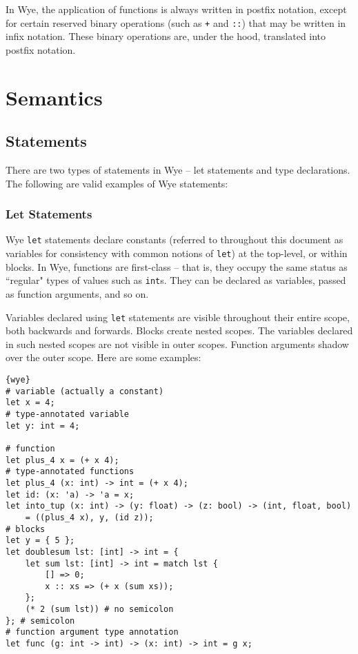 \documentclass[a4paper, 12pt]{article}
\begin{document}
In Wye, the application of functions is always written in postfix notation, except for certain reserved binary operations (such as \texttt{+} and \texttt{::}) that may be written in infix notation. These binary operations are, under the hood, translated into postfix notation.

\section{Semantics}

\subsection{Statements}
There are two types of statements in Wye -- let statements and type declarations. The following are valid examples of Wye statements:

\subsubsection{Let Statements}
Wye \texttt{let} statements declare constants (referred to throughout this document as variables for consistency with common notions of \texttt{let}) at the top-level, or within blocks. In Wye, functions are first-class -- that is, they occupy the same status as ``regular" types of values such as \texttt{int}s. They can be declared as variables, passed as function arguments, and so on.

Variables declared using \texttt{let} statements are visible throughout their entire scope, both backwards and forwards. Blocks create nested scopes. The variables declared in such nested scopes are not visible in outer scopes. Function arguments shadow over the outer scope. Here are some examples:
\begin{lstlisting}{wye}
# variable (actually a constant)
let x = 4;
# type-annotated variable
let y: int = 4;

# function
let plus_4 x = (+ x 4);
# type-annotated functions
let plus_4 (x: int) -> int = (+ x 4);
let id: (x: 'a) -> 'a = x;
let into_tup (x: int) -> (y: float) -> (z: bool) -> (int, float, bool)
	= ((plus_4 x), y, (id z));
# blocks
let y = { 5 };
let doublesum lst: [int] -> int = {
	let sum lst: [int] -> int = match lst {
		[] => 0;
		x :: xs => (+ x (sum xs));
	};
	(* 2 (sum lst)) # no semicolon
}; # semicolon
# function argument type annotation
let func (g: int -> int) -> (x: int) -> int = g x;
\end{lstlisting}
\end{document}
